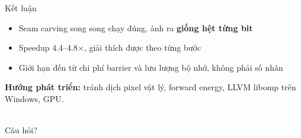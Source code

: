 \documentclass[aspectratio=169,11pt]{beamer}
\newcommand{\x}{\ensuremath{\times}}
\begin{document}
\begin{frame}{Kết luận}
  \begin{itemize}
    \item Seam carving song song chạy đúng, ảnh ra \textbf{giống hệt từng bit}
    \item Speedup \alert{4.4--4.8\x}, giải thích được theo từng bước
    \item Giới hạn đến từ chi phí barrier và lưu lượng bộ nhớ, không phải số nhân
  \end{itemize}
  \vspace{6pt}
  \textbf{Hướng phát triển:} tránh dịch pixel vật lý, forward energy, LLVM libomp trên Windows, GPU.
  \vspace{18pt}

  \\[4pt]
  {\large Câu hỏi?}
\end{frame}
\end{document}
